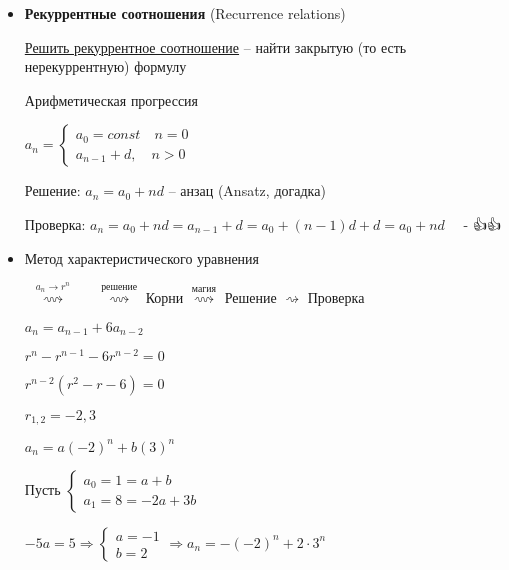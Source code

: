 \documentclass[12pt]{article}
\begin{document}
    \begin{itemize}
        \item \textbf{Рекуррентные соотношения} (Recurrence relations)

        \underline{Решить рекуррентное соотношение} -- найти закрытую (то есть нерекуррентную) формулу

        \Ex Арифметическая прогрессия

        $a_n = \begin{cases}a_0 = const \quad n = 0 \\ a_{n - 1} + d, \quad n > 0\end{cases}$

        Решение: $a_n = a_0 + nd$ -- анзац (Ansatz, догадка)

        Проверка: $a_n = a_0 + nd = a_{n - 1} + d = a_0 + (n - 1)d + d = a_0 + nd \quad$ - {\Large👍👍}

        \item Метод характеристического уравнения

         \ $\stackrel{a_n \to r^n}{\rightsquigarrow}$ \  \ $\stackrel{\text{решение}}{\rightsquigarrow}$ Корни $\stackrel{\text{магия}}{\rightsquigarrow}$ Решение $\rightsquigarrow$ Проверка

        \Ex $a_n = a_{n - 1} + 6a_{n - 2}$

        $r^n - r^{n - 1} - 6r^{n - 2} = 0$

        $r^{n-  2} (r^2 - r - 6) = 0$

        $r_{1,2} = -2, 3$


        \vspace{3mm}

        $a_n = a(-2)^n + b(3)^n$

        Пусть $\begin{cases}a_0 = 1 = a + b \\ a_1 = 8 = -2a + 3b\end{cases}$

        $-5a = 5 \Longrightarrow \begin{cases}a = -1 \\ b = 2\end{cases} \Longrightarrow a_n = -(-2)^n + 2 \cdot 3^n$


\end{itemize}
\end{document}
